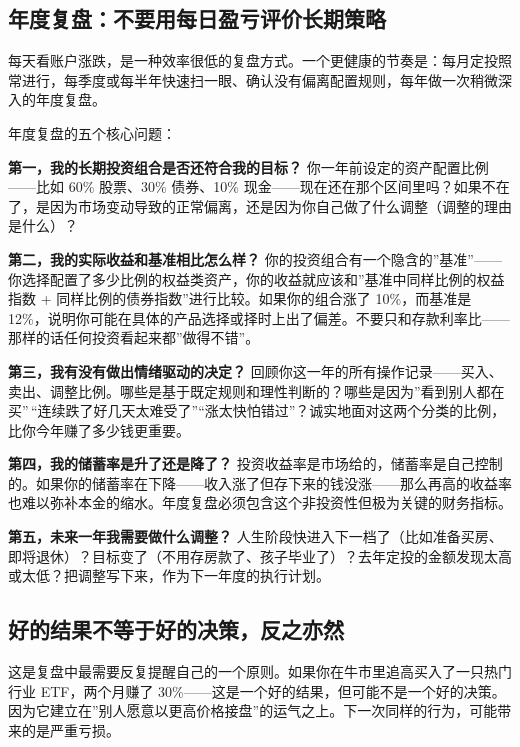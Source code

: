 \documentclass[a4paper,11pt,oneside,fontset=none,UTF8,zihao=-4]{ctexbook}
\begin{document}
\subsection{年度复盘：不要用每日盈亏评价长期策略}\label{ux5e74ux5ea6ux590dux76d8ux4e0dux8981ux7528ux6bcfux65e5ux76c8ux4e8fux8bc4ux4ef7ux957fux671fux7b56ux7565}

每天看账户涨跌，是一种效率很低的复盘方式。一个更健康的节奏是：每月定投照常进行，每季度或每半年快速扫一眼、确认没有偏离配置规则，每年做一次稍微深入的年度复盘。

年度复盘的五个核心问题：

\textbf{第一，我的长期投资组合是否还符合我的目标？}
你一年前设定的资产配置比例------比如 60\% 股票、30\% 债券、10\%
现金------现在还在那个区间里吗？如果不在了，是因为市场变动导致的正常偏离，还是因为你自己做了什么调整（调整的理由是什么）？

\textbf{第二，我的实际收益和基准相比怎么样？}
你的投资组合有一个隐含的''基准''------你选择配置了多少比例的权益类资产，你的收益就应该和''基准中同样比例的权益指数
+ 同样比例的债券指数''进行比较。如果你的组合涨了 10\%，而基准是
12\%，说明你可能在具体的产品选择或择时上出了偏差。不要只和存款利率比------那样的话任何投资看起来都''做得不错''。

\textbf{第三，我有没有做出情绪驱动的决定？}
回顾你这一年的所有操作记录------买入、卖出、调整比例。哪些是基于既定规则和理性判断的？哪些是因为''看到别人都在买''\,``连续跌了好几天太难受了''``涨太快怕错过''？诚实地面对这两个分类的比例，比你今年赚了多少钱更重要。

\textbf{第四，我的储蓄率是升了还是降了？}
投资收益率是市场给的，储蓄率是自己控制的。如果你的储蓄率在下降------收入涨了但存下来的钱没涨------那么再高的收益率也难以弥补本金的缩水。年度复盘必须包含这个非投资性但极为关键的财务指标。

\textbf{第五，未来一年我需要做什么调整？}
人生阶段快进入下一档了（比如准备买房、即将退休）？目标变了（不用存房款了、孩子毕业了）？去年定投的金额发现太高或太低？把调整写下来，作为下一年度的执行计划。

\subsection{好的结果不等于好的决策，反之亦然}\label{ux597dux7684ux7ed3ux679cux4e0dux7b49ux4e8eux597dux7684ux51b3ux7b56ux53cdux4e4bux4ea6ux7136}

这是复盘中最需要反复提醒自己的一个原则。如果你在牛市里追高买入了一只热门行业
ETF，两个月赚了
30\%------这是一个好的结果，但可能不是一个好的决策。因为它建立在''别人愿意以更高价格接盘''的运气之上。下一次同样的行为，可能带来的是严重亏损。
\end{document}
